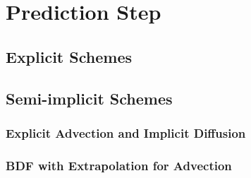\section{Prediction Step}

\subsection{Explicit Schemes}

\subsection{Semi-implicit Schemes}

\subsubsection{Explicit Advection and Implicit Diffusion}

\subsubsection{BDF with Extrapolation for Advection}
